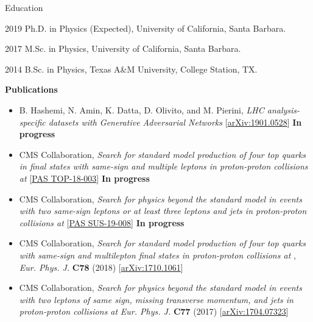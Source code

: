 \begin{vitae}

\begin{vitaesection}{Education}
\vspace{-0.1cm}
\item [2019] Ph.D. in Physics (Expected), University of California, Santa Barbara.
\item [2017] M.Sc. in Physics, University of California, Santa Barbara.
\item [2014] B.Sc. in Physics, Texas A\&M University, College Station, TX.
\end{vitaesection}

\textbf{Publications}



    \begin{itemize}
        \item B. Hashemi, N. Amin, K. Datta, D. Olivito, and M. Pierini, \textit{LHC analysis-specific datasets with Generative Adversarial Networks} [\href{https://arxiv.org/abs/1901.05282}{arXiv:1901.0528}] \textbf{In progress}
        \item CMS Collaboration, \textit{Search for standard model production of four top quarks in final states with same-sign and multiple leptons in proton-proton collisions at \sthirteen} 
            [\href{http://inspirehep.net/record/1726177}{PAS TOP-18-003}] \textbf{In progress}
        \item CMS Collaboration, \textit{Search for physics beyond the standard model in events with two same-sign leptons or at least three leptons and jets in proton-proton collisions at \sthirteen} 
            [\href{http://inspirehep.net/record/1726691}{PAS SUS-19-008}] \textbf{In progress}
        \item CMS Collaboration, \textit{Search for standard model production of four top quarks with same-sign and multilepton final states in proton-proton collisions at \sthirteen},
            \textit{Eur. Phys. J.} \textbf{C78} (2018) 
            [\href{https://arxiv.org/abs/1710.1061}{arXiv:1710.1061}]
        \item CMS Collaboration, \textit{Search for physics beyond the standard model in events with two leptons of same sign, missing transverse momentum, and jets in proton-proton collisions at \sthirteen}
            \textit{Eur. Phys. J.} \textbf{C77} (2017) 
            [\href{https://arxiv.org/abs/1704.07323}{arXiv:1704.07323}]
    \end{itemize}

\end{vitae}
